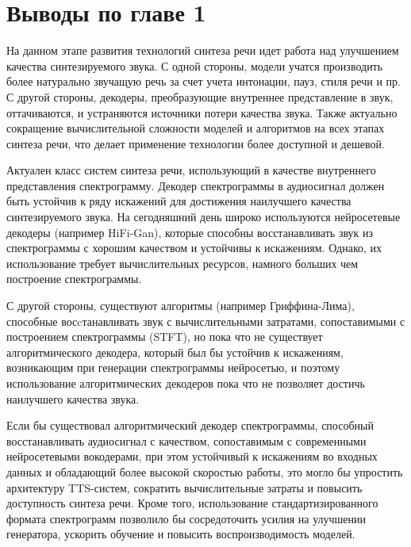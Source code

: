 \section{Выводы по главе 1}

На данном этапе развития технологий синтеза речи идет работа над улучшением качества синтезируемого звука. С одной стороны, модели учатся производить
более натурально звучащую речь за счет учета интонации, пауз, стиля речи и пр. С другой стороны, декодеры, преобразующие внутреннее представление в звук,
оттачиваются, и устраняются источники потери качества звука. 
Также актуально сокращение вычислительной сложности моделей и алгоритмов на всех этапах синтеза речи, что делает применение технологии более доступной и дешевой.

Актуален класс систем синтеза речи, использующий в качестве внутреннего представления спектрограмму. 
Декодер спектрограммы в аудиосигнал должен быть устойчив к ряду искажений для достижения наилучшего качества синтезируемого звука.
На сегодняшний день широко используются нейросетевые декодеры (например HiFi-Gan), 
которые способны восстанавливать звук из спектрограммы с хорошим качеством и устойчивы к искажениям. 
Однако, их использование требует вычислительных ресурсов, намного больших чем построение спектрограммы.

С другой стороны, существуют алгоритмы (например Гриффина-Лима), способные восcтанавливать звук с вычислительными затратами, сопоставимыми с построением спектрограммы (STFT),
но пока что не существует алгоритмического декодера, который был бы устойчив к искажениям, возникающим при генерации спектрограммы нейросетью, 
и поэтому использование алгоритмических декодеров пока что не позволяет достичь наилучшего качества звука.

Если бы существовал алгоритмический декодер спектрограммы, способный восстанавливать аудиосигнал с качеством, 
сопоставимым с современными нейросетевыми вокодерами, при этом устойчивый к искажениям во входных данных и обладающий более высокой скоростью работы, 
это могло бы упростить архитектуру TTS-систем, сократить вычислительные затраты и повысить доступность синтеза речи. 
Кроме того, использование стандартизированного формата спектрограмм позволило бы сосредоточить усилия на улучшении генератора, 
ускорить обучение и повысить воспроизводимость моделей.
